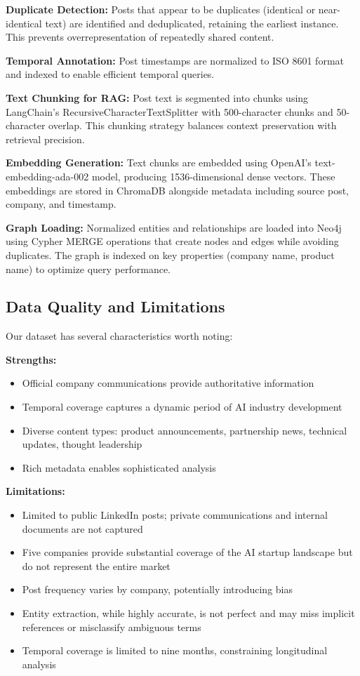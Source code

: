 \documentclass[11pt,twocolumn]{article}
\begin{document}
\textbf{Duplicate Detection:} Posts that appear to be duplicates (identical or near-identical text) are identified and deduplicated, retaining the earliest instance. This prevents overrepresentation of repeatedly shared content.

\textbf{Temporal Annotation:} Post timestamps are normalized to ISO 8601 format and indexed to enable efficient temporal queries.

\textbf{Text Chunking for RAG:} Post text is segmented into chunks using LangChain's RecursiveCharacterTextSplitter with 500-character chunks and 50-character overlap. This chunking strategy balances context preservation with retrieval precision.

\textbf{Embedding Generation:} Text chunks are embedded using OpenAI's text-embedding-ada-002 model, producing 1536-dimensional dense vectors. These embeddings are stored in ChromaDB alongside metadata including source post, company, and timestamp.

\textbf{Graph Loading:} Normalized entities and relationships are loaded into Neo4j using Cypher MERGE operations that create nodes and edges while avoiding duplicates. The graph is indexed on key properties (company name, product name) to optimize query performance.

\subsection{Data Quality and Limitations}

Our dataset has several characteristics worth noting:

\textbf{Strengths:}
\begin{itemize}
\item Official company communications provide authoritative information
\item Temporal coverage captures a dynamic period of AI industry development
\item Diverse content types: product announcements, partnership news, technical updates, thought leadership
\item Rich metadata enables sophisticated analysis
\end{itemize}

\textbf{Limitations:}
\begin{itemize}
\item Limited to public LinkedIn posts; private communications and internal documents are not captured
\item Five companies provide substantial coverage of the AI startup landscape but do not represent the entire market
\item Post frequency varies by company, potentially introducing bias
\item Entity extraction, while highly accurate, is not perfect and may miss implicit references or misclassify ambiguous terms
\item Temporal coverage is limited to nine months, constraining longitudinal analysis
\end{itemize}
\end{document}
